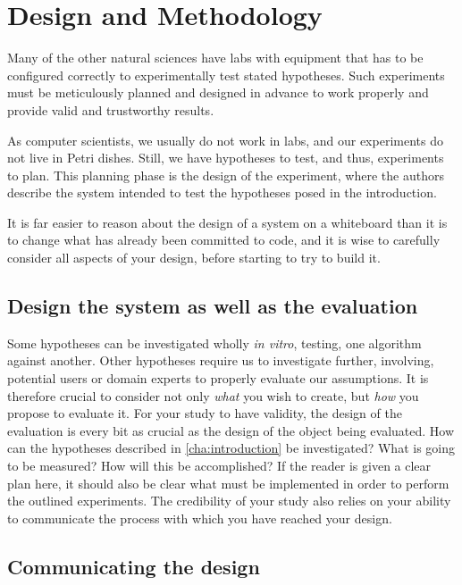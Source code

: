 \chapter{Design and Methodology}
\label{cha:design-and-method}

Many of the other natural sciences have labs with equipment that has to be
configured correctly to experimentally test stated hypotheses.  Such
experiments must be meticulously planned and designed in advance to work
properly and provide valid and trustworthy results.

As computer scientists, we usually do not work in labs, and our experiments
do not live in Petri dishes. Still, we have hypotheses to test, and thus,
experiments to plan. This planning phase is the design of the experiment,
where the authors describe the system intended to test the hypotheses posed
in the introduction.

It is far easier to reason about the design of a system on a whiteboard than
it is to change what has already been committed to code, and it is wise to
carefully consider all aspects of your design, before starting to try to
build it.


\section{Design the system as well as the evaluation}
\label{sec:design-system-as}

Some hypotheses can be investigated wholly \emph{in vitro}, testing, \eg one
algorithm against another. Other hypotheses require us to investigate
further, involving, \eg potential users or domain experts to properly
evaluate our assumptions. It is therefore crucial to consider not only
\emph{what} you wish to create, but \emph{how} you propose to evaluate
it. For your study to have validity, the design of the evaluation is every
bit as crucial as the design of the object being evaluated.  How can the
hypotheses described in \autoref{cha:introduction} be investigated?  What is
going to be measured? How will this be accomplished? If the reader is given
a clear plan here, it should also be clear what must be implemented in order
to perform the outlined experiments.  The credibility of your study also
relies on your ability to communicate the process with which you have
reached your design.

\section{Communicating the design}
\label{sec:communicating-design}

